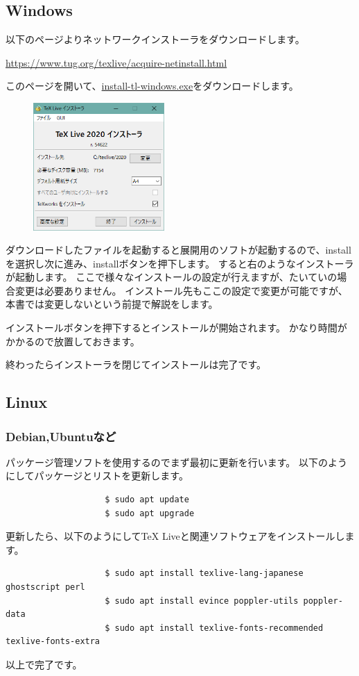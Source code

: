 		\subsection{Windows}
			以下のページよりネットワークインストーラをダウンロードします。
			\begin{mdframed}[style=shadow]
				\url{https://www.tug.org/texlive/acquire-netinstall.html}
			\end{mdframed}
			このページを開いて、\url{install-tl-windows.exe}をダウンロードします。

			\begin{figure}
				\centering
				\includegraphics[width=5cm]{TeXlive-installer2.png}
			\end{figure}

			ダウンロードしたファイルを起動すると展開用のソフトが起動するので、installを選択し次に進み、installボタンを押下します。
			すると右のようなインストーラが起動します。
			ここで様々なインストールの設定が行えますが、たいていの場合変更は必要ありません。
			インストール先もここの設定で変更が可能ですが、本書では変更しないという前提で解説をします。

			インストールボタンを押下するとインストールが開始されます。
			かなり時間がかかるので放置しておきます。

			終わったらインストーラを閉じてインストールは完了です。

		\subsection{Linux}
			\subsubsection{Debian,Ubuntuなど}
				パッケージ管理ソフトを使用するのでまず最初に更新を行います。
				以下のようにしてパッケージとリストを更新します。
				\begin{mdframed}[style=bash]
					\begin{verbatim}
					$ sudo apt update
					$ sudo apt upgrade
					\end{verbatim}
				\end{mdframed}
				更新したら、以下のようにしてTeX Liveと関連ソフトウェアをインストールします。
				\begin{mdframed}[style=bash]
					\begin{verbatim}
					$ sudo apt install texlive-lang-japanese ghostscript perl
					$ sudo apt install evince poppler-utils poppler-data
					$ sudo apt install texlive-fonts-recommended texlive-fonts-extra
					\end{verbatim}
				\end{mdframed}
				以上で完了です。

